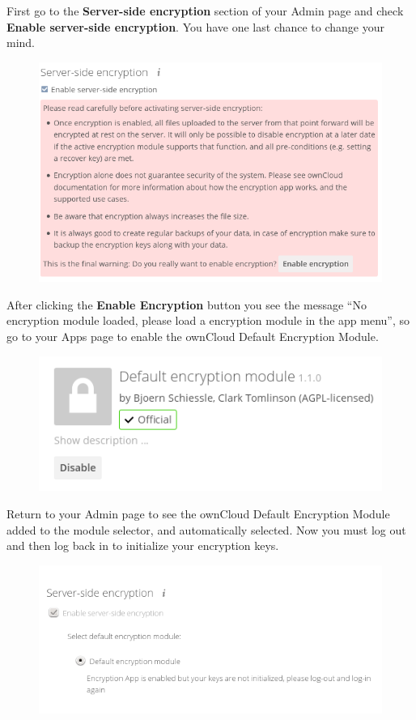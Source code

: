 \documentclass[letterpaper,10pt,english]{sphinxmanual}
\begin{document}
First go to the \textbf{Server-side encryption} section of your Admin page and check
\textbf{Enable server-side encryption}. You have one last chance to change your mind.
\begin{figure}[htbp]
\centering

\includegraphics{encryption3.png}
\end{figure}

After clicking the \textbf{Enable Encryption} button you see the message ``No
encryption module loaded, please load a encryption module in the app menu'', so
go to your Apps page to enable the ownCloud Default Encryption Module.
\begin{figure}[htbp]
\centering

\includegraphics{encryption1.png}
\end{figure}

Return to your Admin page to see the ownCloud Default Encryption
Module added to the module selector, and automatically selected. Now you must
log out and then log back in to initialize your encryption keys.
\begin{figure}[htbp]
\centering

\includegraphics{encryption14.png}
\end{figure}
\end{document}
